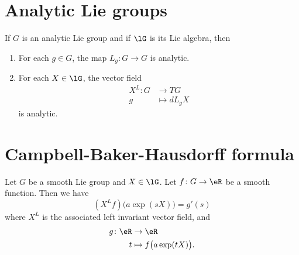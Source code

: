 \section{Analytic Lie groups}

\begin{proposition}	\label{PROPooDEZZooMdbrnb}
	If \( G\) is an analytic Lie group and if \( \lG\) is its Lie algebra, then
	\begin{enumerate}
		\item
		      For each \( g\in G\), the map \(L_g \colon G\to G  \) is analytic.
		\item
		      For each \( X\in \lG\), the vector field
		      \begin{equation}
			      \begin{aligned}
				      X^L\colon G & \to TG        \\
				      g           & \mapsto dL_gX
			      \end{aligned}
		      \end{equation}
		      is analytic.
	\end{enumerate}
\end{proposition}


\section{Campbell-Baker-Hausdorff formula}


\begin{proposition}	\label{PROPooNEIHooWQctei}
	Let \( G\) be a smooth Lie group and \( X\in\lG\). Let \(f \colon G\to \eR  \) be a smooth function. Then we have
	\begin{equation}
		(X^Lf)\big( a\exp(sX) \big)=g'(s)
	\end{equation}
	where \( X^L\) is the associated left invariant vector field, and
	\begin{equation}
		\begin{aligned}
			g\colon \eR & \to \eR                         \\
			t           & \mapsto f\big( a\exp(tX) \big).
		\end{aligned}
	\end{equation}
\end{proposition}


